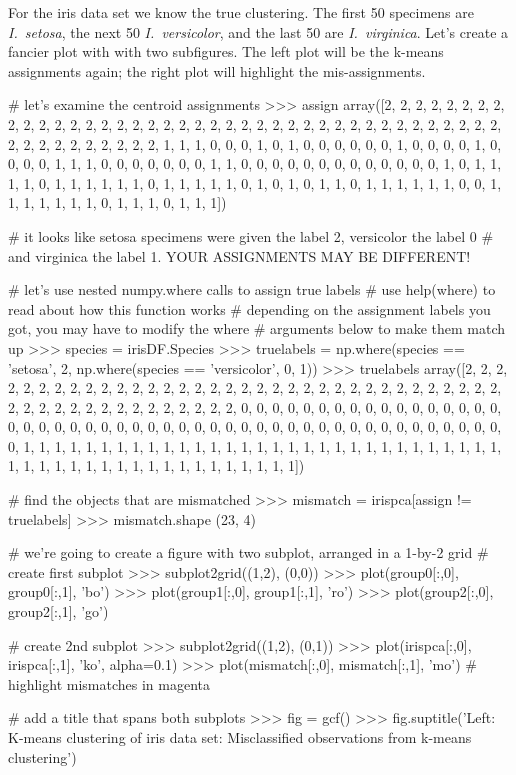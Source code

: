 For the iris data set we know the true clustering.  The first 50 specimens are \textit{I.~setosa}, the next 50 \textit{I.~versicolor}, and the last 50 are \textit{I.~virginica}.  Let's create a fancier plot with with two subfigures. The left plot will be the k-means assignments again; the right plot will highlight the mis-assignments.
%
\begin{python}
# let's examine the centroid assignments
>>> assign
array([2, 2, 2, 2, 2, 2, 2, 2, 2, 2, 2, 2, 2, 2, 2, 2, 2, 2, 2, 2, 2, 2, 2,
       2, 2, 2, 2, 2, 2, 2, 2, 2, 2, 2, 2, 2, 2, 2, 2, 2, 2, 2, 2, 2, 2, 2,
       2, 2, 2, 2, 1, 1, 1, 0, 0, 0, 1, 0, 1, 0, 0, 0, 0, 0, 0, 1, 0, 0, 0,
       0, 1, 0, 0, 0, 0, 1, 1, 1, 0, 0, 0, 0, 0, 0, 0, 1, 1, 0, 0, 0, 0, 0,
       0, 0, 0, 0, 0, 0, 0, 0, 1, 0, 1, 1, 1, 1, 0, 1, 1, 1, 1, 1, 1, 0, 1,
       1, 1, 1, 1, 0, 1, 0, 1, 0, 1, 1, 0, 1, 1, 1, 1, 1, 1, 0, 0, 1, 1, 1,
       1, 1, 1, 1, 0, 1, 1, 1, 0, 1, 1, 1])

# it looks like setosa specimens were given the label 2, versicolor the label 0
# and virginica the label 1. YOUR ASSIGNMENTS MAY BE DIFFERENT!

# let's use nested numpy.where calls to assign true labels
# use help(where) to read about how this function works
# depending on the assignment labels you got, you may have to modify the where
# arguments below to make them match up
>>> species = irisDF.Species
>>> truelabels = np.where(species == 'setosa', 2, np.where(species == 'versicolor', 0, 1))
>>> truelabels
array([2, 2, 2, 2, 2, 2, 2, 2, 2, 2, 2, 2, 2, 2, 2, 2, 2, 2, 2, 2, 2, 2, 2,
       2, 2, 2, 2, 2, 2, 2, 2, 2, 2, 2, 2, 2, 2, 2, 2, 2, 2, 2, 2, 2, 2, 2,
       2, 2, 2, 2, 0, 0, 0, 0, 0, 0, 0, 0, 0, 0, 0, 0, 0, 0, 0, 0, 0, 0, 0,
       0, 0, 0, 0, 0, 0, 0, 0, 0, 0, 0, 0, 0, 0, 0, 0, 0, 0, 0, 0, 0, 0, 0,
       0, 0, 0, 0, 0, 0, 0, 0, 1, 1, 1, 1, 1, 1, 1, 1, 1, 1, 1, 1, 1, 1, 1,
       1, 1, 1, 1, 1, 1, 1, 1, 1, 1, 1, 1, 1, 1, 1, 1, 1, 1, 1, 1, 1, 1, 1,
       1, 1, 1, 1, 1, 1, 1, 1, 1, 1, 1, 1])

# find the objects that are mismatched
>>> mismatch = irispca[assign != truelabels]
>>> mismatch.shape
(23, 4)

# we're going to create a figure with two subplot, arranged in a 1-by-2 grid
# create first subplot
>>> subplot2grid((1,2), (0,0))
>>> plot(group0[:,0], group0[:,1], 'bo')
>>> plot(group1[:,0], group1[:,1], 'ro')
>>> plot(group2[:,0], group2[:,1], 'go')

# create 2nd subplot
>>> subplot2grid((1,2), (0,1))
>>> plot(irispca[:,0], irispca[:,1], 'ko', alpha=0.1)
>>> plot(mismatch[:,0], mismatch[:,1], 'mo')  # highlight mismatches in magenta

# add a title that spans both subplots
>>> fig = gcf()
>>> fig.suptitle('Left: K-means clustering of iris data set\nRight: Misclassified observations from k-means clustering')
\end{python}

